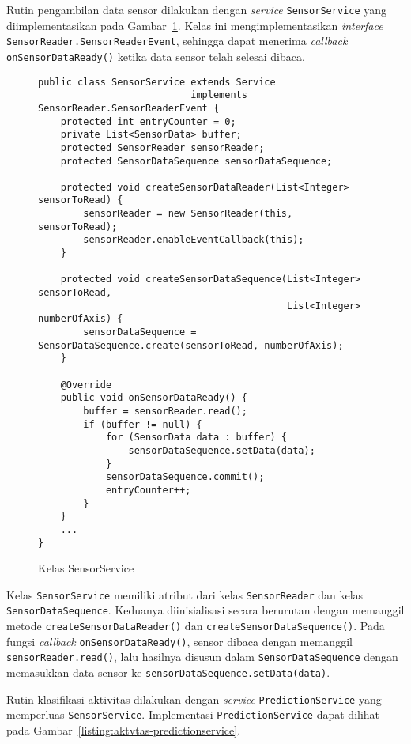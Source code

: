 Rutin pengambilan data sensor dilakukan dengan \textit{service} \texttt{SensorService} yang diimplementasikan pada Gambar~\ref{listing:aktvtas-sensorservice}. Kelas ini mengimplementasikan \textit{interface} \texttt{SensorReader.SensorReaderEvent}, sehingga dapat menerima \textit{callback} \texttt{onSensorDataReady()} ketika data sensor telah selesai dibaca.

\begin{figure}[h]
\begin{verbatim}
public class SensorService extends Service
                           implements SensorReader.SensorReaderEvent {
    protected int entryCounter = 0;
    private List<SensorData> buffer;
    protected SensorReader sensorReader;
    protected SensorDataSequence sensorDataSequence;

    protected void createSensorDataReader(List<Integer> sensorToRead) {
        sensorReader = new SensorReader(this, sensorToRead);
        sensorReader.enableEventCallback(this);
    }

    protected void createSensorDataSequence(List<Integer> sensorToRead,
                                            List<Integer> numberOfAxis) {
        sensorDataSequence = SensorDataSequence.create(sensorToRead, numberOfAxis);
    }

    @Override
    public void onSensorDataReady() {
        buffer = sensorReader.read();
        if (buffer != null) {
            for (SensorData data : buffer) {
                sensorDataSequence.setData(data);
            }
            sensorDataSequence.commit();
            entryCounter++;
        }
    }
    ...
}
\end{verbatim}
\caption{Kelas SensorService}
\label{listing:aktvtas-sensorservice}
\end{figure}

Kelas \texttt{SensorService} memiliki atribut dari kelas \texttt{SensorReader} dan kelas \texttt{SensorDataSequence}. Keduanya diinisialisasi secara berurutan dengan memanggil metode \texttt{createSensorDataReader()} dan \texttt{createSensorDataSequence()}. Pada fungsi \textit{callback} \texttt{onSensorDataReady()}, sensor dibaca dengan memanggil \texttt{sensorReader.read()}, lalu hasilnya disusun dalam \texttt{SensorDataSequence} dengan memasukkan data sensor ke \texttt{sensorDataSequence.setData(data)}.

Rutin klasifikasi aktivitas dilakukan dengan \textit{service} \texttt{PredictionService} yang memperluas \texttt{SensorService}. Implementasi \texttt{PredictionService} dapat dilihat pada Gambar~\ref{listing:aktvtas-predictionservice}.

